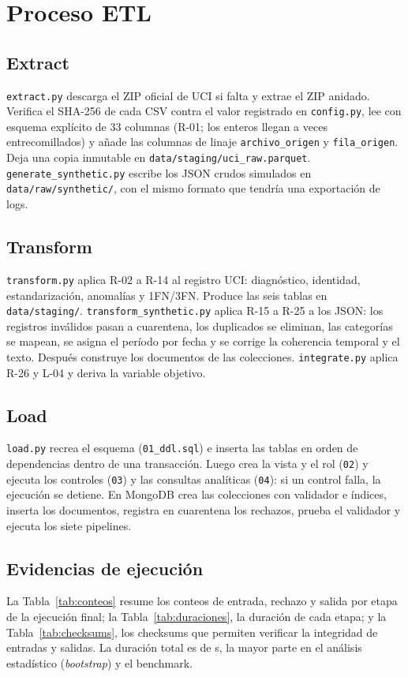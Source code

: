 \documentclass[11pt,a4paper]{article}
\begin{document}
\section{Proceso ETL}
\subsection{Extract}
\texttt{extract.py} descarga el ZIP oficial de UCI si falta y extrae el ZIP anidado. Verifica el
SHA-256 de cada CSV contra el valor registrado en \texttt{config.py}, lee con esquema explícito de 33
columnas (R-01; los enteros llegan a veces entrecomillados) y añade las columnas de linaje
\texttt{archivo\_origen} y \texttt{fila\_origen}. Deja una copia inmutable en
\texttt{data/staging/uci\_raw.parquet}. \texttt{generate\_synthetic.py} escribe los JSON crudos
simulados en \texttt{data/raw/synthetic/}, con el mismo formato que tendría una exportación de logs.

\subsection{Transform}
\texttt{transform.py} aplica R-02 a R-14 al registro UCI: diagnóstico, identidad,
estandarización, anomalías y 1FN/3FN. Produce las seis tablas en \texttt{data/staging/}.
\texttt{transform\_synthetic.py} aplica R-15 a R-25 a los JSON: los registros inválidos pasan a
cuarentena, los duplicados se eliminan, las categorías se mapean, se asigna el período por fecha y se
corrige la coherencia temporal y el texto. Después construye los documentos de las colecciones.
\texttt{integrate.py} aplica R-26 y L-04 y deriva la variable objetivo.

\subsection{Load}
\texttt{load.py} recrea el esquema (\texttt{01\_ddl.sql}) e inserta las tablas en orden de
dependencias dentro de una transacción. Luego crea la vista y el rol (\texttt{02}) y ejecuta los
controles (\texttt{03}) y las consultas analíticas (\texttt{04}): si un control falla, la ejecución
se detiene. En MongoDB crea las colecciones con validador e índices, inserta los documentos, registra
en cuarentena los rechazos, prueba el validador y ejecuta los siete pipelines.

\subsection{Evidencias de ejecución}
La Tabla~\ref{tab:conteos} resume los conteos de entrada, rechazo y salida por etapa de la ejecución final; la Tabla~\ref{tab:duraciones}, la duración de cada etapa; y la Tabla~\ref{tab:checksums}, los checksums que permiten verificar la integridad de entradas y salidas. La duración total es de \tiempoTotal{} s, la
mayor parte en el análisis estadístico (\emph{bootstrap}) y el benchmark.
\end{document}
